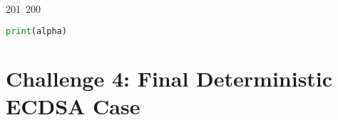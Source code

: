 201~200~\documentclass{article}
\begin{document}
\begin{lstlisting}[language=Python, caption = Cracking private key Chall 3]
	                                                                        	                                                                    	                                	                    	                    	                        	                        	                    	                                                                	                	                                                                    	                    							                                                                                                                                                                                                    		                                                                                                                        				    			                                                                    print(alpha)
	                                                                        	                                                                    	                                	                    	                    	                        	                        	                    	                                                                	                	                                                                    	                    							                                                                                                                                                                                                    		                                                                                                                        				    			                                                                    \end{lstlisting}


	                                                                        	                                                                    	                                	                    	                    	                        	                        	                    	                                                                	                	                                                                    	                    							                                                                                                                                                                                                    		                                                                                                                        				    			                                                                    \section{Challenge 4: Final Deterministic ECDSA Case}
\end{document}
